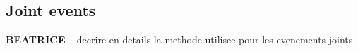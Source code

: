 %
%
%
%



\subsection{Joint events\label{Sec:Joint_events}}

\textbf{BEATRICE} -- decrire en details la methode utilisee pour les evenements joints


